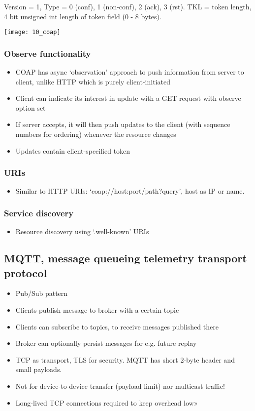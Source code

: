 Version = 1, Type = 0 (conf), 1 (non-conf), 2 (ack), 3 (rst). TKL = token
length, 4 bit unsigned int length of token field (0 - 8 bytes).

\texttt{[image: 10\_coap]}

\subsubsection{Observe functionality}

\begin{itemize}
		\item COAP has async `observation' approach to push information from
				server to client, unlike HTTP which is purely client-initiated
		\item Client can indicate its interest in update with a GET request
				with observe option set
		\item If server accepts, it will then push updates to the client (with
				sequence numbers for ordering) whenever the resource changes
		\item Updates contain client-specified token
\end{itemize}

\subsubsection{URIs}

\begin{itemize}
		\item Similar to HTTP URIs: `coap://host:port/path?query', host as IP or name.
\end{itemize}

\subsubsection{Service discovery}

\begin{itemize}
		\item Resource discovery using `.well-known' URIs
\end{itemize}

\subsection{MQTT, message queueing telemetry transport protocol}

\begin{itemize}
		\item Pub/Sub pattern
		\item Clients publish message to broker with a certain topic
		\item Clients can subscribe to topics, to receive messages published there
		\item Broker can optionally persist messages for e.g. future replay
		\item TCP as transport, TLS for security. MQTT has short 2-byte header and small payloads.
		\item Not for device-to-device transfer (payload limit) nor multicast traffic!
		\item Long-lived TCP connections required to keep overhead low»
\end{itemize}

